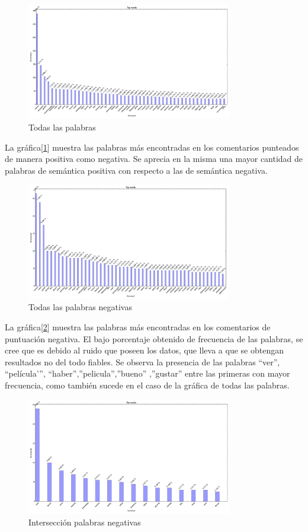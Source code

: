 \documentclass[12pt]{article}
\begin{document}
\begin{figure}[!h]
  \centering
    \includegraphics[width=0.8\textwidth]{./fig/AllWords.png}
  \caption{Todas las palabras}
  \label{fig:todas}
\end{figure} 
La gráfica[\ref{fig:todas}] muestra las palabras más encontradas en los comentarios punteados de manera positiva como negativa. Se aprecia en la misma una mayor cantidad de palabras de semántica positiva con respecto a las de semántica negativa.


\begin{figure}[!h]
  \centering
    \includegraphics[width=0.8\textwidth]{./fig/NegativeWords.png}
  \caption{Todas las palabras negativas}
  \label{fig:allneg}
\end{figure} 
La gráfica[\ref{fig:allneg}] muestra las palabras más encontradas en los comentarios de puntuación negativa. El bajo porcentaje obtenido de frecuencia de las palabras, se cree que es debido al ruido que poseen los datos, que lleva a que se obtengan resultados no del todo fiables. Se observa la presencia de las palabras “ver”, “película'”, “haber”,”pelicula”,”bueno” ,”gustar” entre las primeras con mayor frecuencia, como también sucede en el caso de la gráfica de todas las palabras.


\begin{figure}[!h]
  \centering
    \includegraphics[width=0.8\textwidth]{./fig/NegativeSubjetive.png}
  \caption{Intersección palabras negativas}
  \label{fig:negsub}
\end{figure} 
\end{document}
